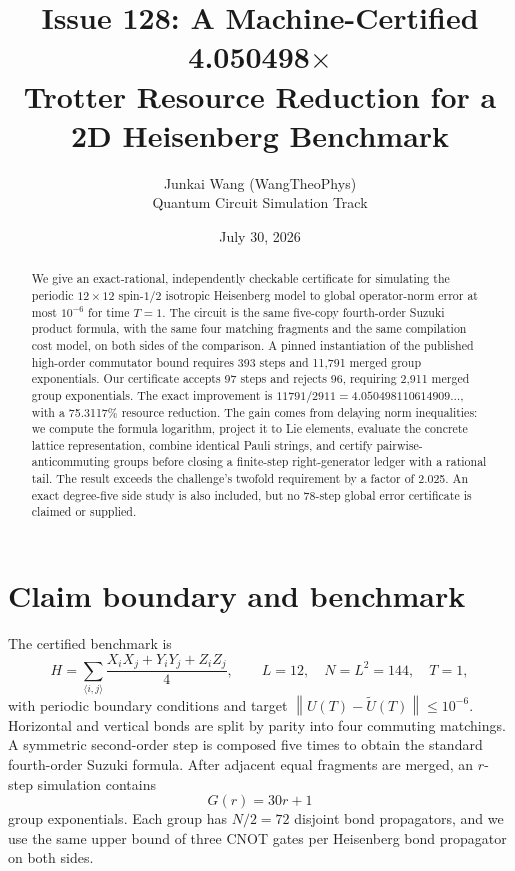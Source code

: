 \documentclass[11pt]{article}
\title{\textbf{Issue 128: A Machine-Certified 4.050498$\times$\\
Trotter Resource Reduction for a 2D Heisenberg Benchmark}}
\author{Junkai Wang (WangTheoPhys)\\
\small Quantum Circuit Simulation Track}
\date{July 30, 2026}
\newcommand{\opnorm}[1]{\left\lVert #1\right\rVert}
\begin{document}
\maketitle

\begin{abstract}
We give an exact-rational, independently checkable certificate for simulating
the periodic $12\times12$ spin-$1/2$ isotropic Heisenberg model to global
operator-norm error at most $10^{-6}$ for time $T=1$.  The circuit is the same
five-copy fourth-order Suzuki product formula, with the same four matching
fragments and the same compilation cost model, on both sides of the
comparison.  A pinned instantiation of the published high-order commutator
bound requires 393 steps and 11,791 merged group exponentials.  Our certificate
accepts 97 steps and rejects 96, requiring 2,911 merged group exponentials.
The exact improvement is $11791/2911=4.050498110614909\ldots$, with a
75.3117\% resource reduction.  The gain comes from delaying norm inequalities:
we compute the formula logarithm, project it to Lie elements, evaluate the
concrete lattice representation, combine identical Pauli strings, and certify
pairwise-anticommuting groups before closing a finite-step right-generator
ledger with a rational tail.  The result exceeds the challenge's twofold
requirement by a factor of 2.025.  An exact degree-five side study is also
included, but no 78-step global error certificate is claimed or supplied.
\end{abstract}

\section{Claim boundary and benchmark}

The certified benchmark is
\begin{equation}
  H=\sum_{\langle i,j\rangle}
  \frac{X_iX_j+Y_iY_j+Z_iZ_j}{4},
  \qquad L=12,\quad N=L^2=144,\quad T=1,
  \label{eq:hamiltonian}
\end{equation}
with periodic boundary conditions and target
$\opnorm{U(T)-\widetilde U(T)}\le 10^{-6}$.  Horizontal and vertical bonds are
split by parity into four commuting matchings.  A symmetric second-order step
is composed five times to obtain the standard fourth-order Suzuki formula.
After adjacent equal fragments are merged, an $r$-step simulation contains
\begin{equation}
  G(r)=30r+1
  \label{eq:groups}
\end{equation}
group exponentials.  Each group has $N/2=72$ disjoint bond propagators, and we
use the same upper bound of three CNOT gates per Heisenberg bond propagator on
both sides.
\end{document}
